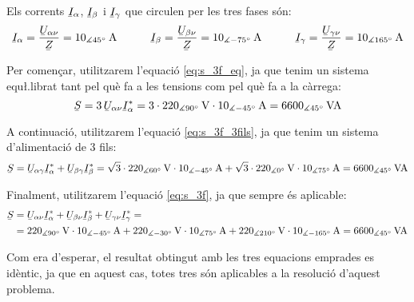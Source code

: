 \begin{exemple}
    Els corrents $\cmplx{I}_\alpha$, $\cmplx{I}_\beta$ i $\cmplx{I}_\gamma$ que
    circulen  per les tres fases s\'{o}n:
    \[
        \cmplx{I}_\alpha =\frac{\cmplx{U}_{\alpha\nu}}{\cmplx{Z}} =
        10_{\measuredangle 45\degree}\unit{A}
        \qquad\quad
        \cmplx{I}_\beta =\frac{\cmplx{U}_{\beta\nu}}{\cmplx{Z}} =
        10_{\measuredangle -75\degree}\unit{A}
        \qquad\quad
        \cmplx{I}_\gamma =\frac{\cmplx{U}_{\gamma\nu}}{\cmplx{Z}} =
        10_{\measuredangle 165\degree}\unit{A}
    \]

    Per comen\c{c}ar,  utilitzarem l'equaci\'{o} \eqref{eq:s_3f_eq}, ja que tenim
    un sistema equ{\l.l}ibrat tant pel qu\`{e} fa a les tensions com pel qu\`{e} fa a la c\`{a}rrega:
    \[
    \cmplx{S} = 3\,\cmplx{U}_{\alpha\nu} \cmplx{I}_\alpha^* =
    3\cdot 220_{\measuredangle 90\degree}\unit{V} \cdot
    10_{\measuredangle -45\degree}\unit{A} = 6600_{\measuredangle 45\degree}\unit{VA}
    \]

    A continuaci\'{o},  utilitzarem l'equaci\'{o} \eqref{eq:s_3f_3fils}, ja que tenim
    un sistema d'alimentaci\'{o} de 3 fils:
    \[
    \cmplx{S} = \cmplx{U}_{\alpha\gamma} \cmplx{I}_\alpha^*
     +  \cmplx{U}_{\beta\gamma} \cmplx{I}_\beta^* =
    \sqrt{3}\cdot220_{\measuredangle 60\degree}\unit{V} \cdot
    10_{\measuredangle -45\degree}\unit{A} + \sqrt{3}\cdot220_{\measuredangle 0\degree}\unit{V}
    \cdot 10_{\measuredangle 75\degree}\unit{A}  = 6600_{\measuredangle 45\degree}\unit{VA}
    \]

     Finalment,  utilitzarem l'equaci\'{o} \eqref{eq:s_3f}, ja que
     sempre \'{e}s aplicable:
     \[\begin{split}
     \cmplx{S} &=  \cmplx{U}_{\alpha\nu} \cmplx{I}_\alpha^* +
     \cmplx{U}_{\beta\nu} \cmplx{I}_\beta^* +  \cmplx{U}_{\gamma\nu}
     \cmplx{I}_\gamma^* =\\
     &= 220_{\measuredangle 90\degree}\unit{V}
     \cdot 10_{\measuredangle -45\degree}\unit{A} + 220_{\measuredangle
     -30\degree}\unit{V} \cdot 10_{\measuredangle 75\degree}\unit{A}
     + 220_{\measuredangle 210\degree}\unit{V} \cdot 10_{\measuredangle
     -165\degree}\unit{A} =6600_{\measuredangle 45\degree}\unit{VA}
     \end{split} \]

    Com era d'esperar, el resultat obtingut amb les tres equacions
    emprades es id\`{e}ntic, ja que en aquest cas, totes tres s\'{o}n
    aplicables a la resoluci\'{o} d'aquest problema.
\end{exemple}
